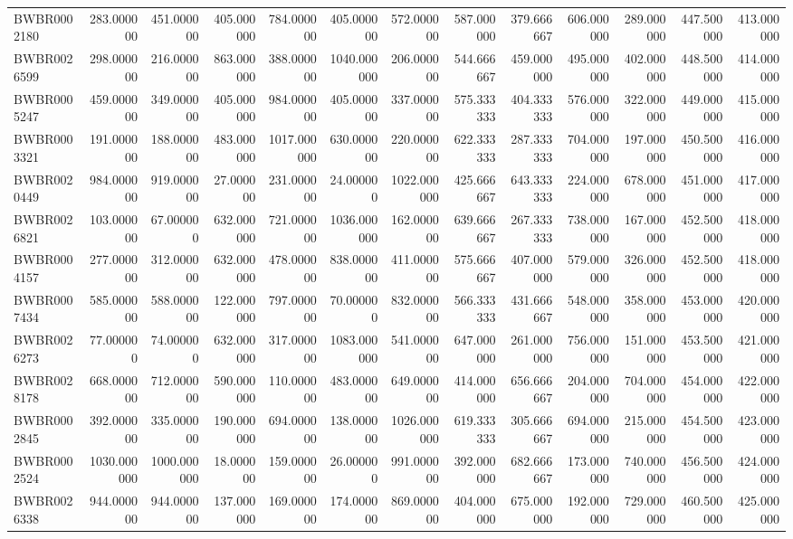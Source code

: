 \begin{longtable}{lrrrrrrrrrrrr}
BWBR0002180 & 283.000000 & 451.000000 & 405.000000 & 784.000000 & 405.000000 & 572.000000 & 587.000000 & 379.666667 & 606.000000 & 289.000000 & 447.500000 & 413.000000 \\
BWBR0026599 & 298.000000 & 216.000000 & 863.000000 & 388.000000 & 1040.000000 & 206.000000 & 544.666667 & 459.000000 & 495.000000 & 402.000000 & 448.500000 & 414.000000 \\
BWBR0005247 & 459.000000 & 349.000000 & 405.000000 & 984.000000 & 405.000000 & 337.000000 & 575.333333 & 404.333333 & 576.000000 & 322.000000 & 449.000000 & 415.000000 \\
BWBR0003321 & 191.000000 & 188.000000 & 483.000000 & 1017.000000 & 630.000000 & 220.000000 & 622.333333 & 287.333333 & 704.000000 & 197.000000 & 450.500000 & 416.000000 \\
BWBR0020449 & 984.000000 & 919.000000 & 27.000000 & 231.000000 & 24.000000 & 1022.000000 & 425.666667 & 643.333333 & 224.000000 & 678.000000 & 451.000000 & 417.000000 \\
BWBR0026821 & 103.000000 & 67.000000 & 632.000000 & 721.000000 & 1036.000000 & 162.000000 & 639.666667 & 267.333333 & 738.000000 & 167.000000 & 452.500000 & 418.000000 \\
BWBR0004157 & 277.000000 & 312.000000 & 632.000000 & 478.000000 & 838.000000 & 411.000000 & 575.666667 & 407.000000 & 579.000000 & 326.000000 & 452.500000 & 418.000000 \\
BWBR0007434 & 585.000000 & 588.000000 & 122.000000 & 797.000000 & 70.000000 & 832.000000 & 566.333333 & 431.666667 & 548.000000 & 358.000000 & 453.000000 & 420.000000 \\
BWBR0026273 & 77.000000 & 74.000000 & 632.000000 & 317.000000 & 1083.000000 & 541.000000 & 647.000000 & 261.000000 & 756.000000 & 151.000000 & 453.500000 & 421.000000 \\
BWBR0028178 & 668.000000 & 712.000000 & 590.000000 & 110.000000 & 483.000000 & 649.000000 & 414.000000 & 656.666667 & 204.000000 & 704.000000 & 454.000000 & 422.000000 \\
BWBR0002845 & 392.000000 & 335.000000 & 190.000000 & 694.000000 & 138.000000 & 1026.000000 & 619.333333 & 305.666667 & 694.000000 & 215.000000 & 454.500000 & 423.000000 \\
BWBR0002524 & 1030.000000 & 1000.000000 & 18.000000 & 159.000000 & 26.000000 & 991.000000 & 392.000000 & 682.666667 & 173.000000 & 740.000000 & 456.500000 & 424.000000 \\
BWBR0026338 & 944.000000 & 944.000000 & 137.000000 & 169.000000 & 174.000000 & 869.000000 & 404.000000 & 675.000000 & 192.000000 & 729.000000 & 460.500000 & 425.000000 \\

\end{longtable}
